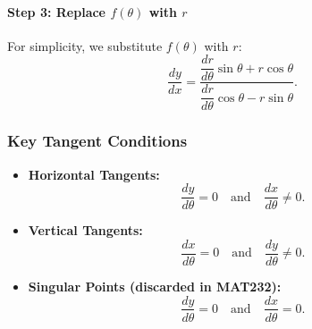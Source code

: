 \documentclass{article}
\begin{document}
\begin{definitionbox}
\paragraph{Step 3: Replace \(f(\theta)\) with \(r\)}
For simplicity, we substitute \(f(\theta)\) with \(r\):
\[
    \dfrac{dy}{dx} = 
    \dfrac{\dfrac{dr}{d\theta} \sin\theta + r \cos\theta}{\dfrac{dr}{d\theta} \cos\theta - r \sin\theta}.
\]

\subsubsection*{Key Tangent Conditions}
\begin{itemize}
    \item \textbf{Horizontal Tangents:} 
    \[
        \dfrac{dy}{d\theta} = 0 \quad \text{and} \quad \dfrac{dx}{d\theta} \neq 0.
    \]
    \item \textbf{Vertical Tangents:} 
    \[
        \dfrac{dx}{d\theta} = 0 \quad \text{and} \quad \dfrac{dy}{d\theta} \neq 0.
    \]
    \item \textbf{Singular Points (discarded in MAT232):}
    \[
        \dfrac{dy}{d\theta} = 0 \quad \text{and} \quad \dfrac{dx}{d\theta} = 0.
    \]
\end{itemize}

\end{definitionbox}
\end{document}
